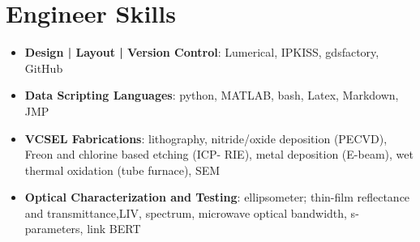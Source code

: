 \documentclass[letterpaper,11pt]{article}
\newcommand{\resumeItem}[2]{
  \item\small{
    \textbf{#1}{: #2 \vspace{-2pt}}
  }
}
\newcommand{\resumeSubItem}[2]{\resumeItem{#1}{#2}\vspace{-4pt}}
\newcommand{\resumeSubHeadingListStart}{\begin{itemize}[leftmargin=*]}
\newcommand{\resumeSubHeadingListEnd}{\end{itemize}}
\begin{document}

\section{Engineer Skills}
  \resumeSubHeadingListStart
    \resumeSubItem{Design | Layout | Version Control}
      {Lumerical, IPKISS, gdsfactory, GitHub}

    \resumeSubItem{Data Scripting Languages}
      {python, MATLAB, bash, Latex, Markdown, JMP}


    \resumeSubItem{VCSEL Fabrications}
      {lithography, nitride/oxide deposition (PECVD), Freon and chlorine based etching (ICP-
      RIE), metal deposition (E-beam), wet thermal oxidation (tube furnace), SEM}

    \resumeSubItem{Optical Characterization and Testing}
      {ellipsometer; thin-film reflectance and transmittance,LIV, spectrum, microwave optical bandwidth, s-parameters, link BERT}

  \resumeSubHeadingListEnd


\end{document}
